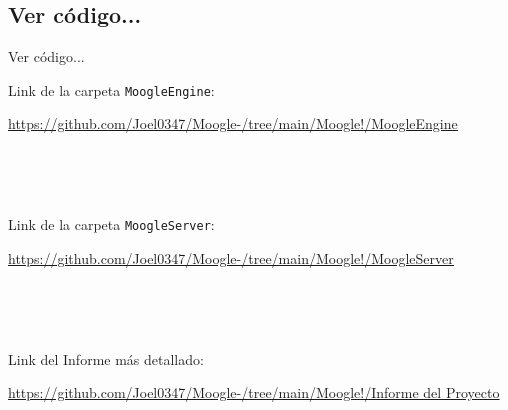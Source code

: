 \subsection{Ver código...}
\begin{frame}[fragile]{Ver código...}

{\small{Link de la carpeta \texttt{MoogleEngine}:}}


\textcolor{blue}{\underline{\tiny\url{https://github.com/Joel0347/Moogle-/tree/main/Moogle!/MoogleEngine}}}


\ 


\ 


{\small{Link de la carpeta \texttt{MoogleServer}:}}


\textcolor{blue}{\underline{\tiny\url{https://github.com/Joel0347/Moogle-/tree/main/Moogle!/MoogleServer}}}


\ 


\


{\small {Link del Informe más detallado:}}


\textcolor{blue}{\underline{\tiny\url{https://github.com/Joel0347/Moogle-/tree/main/Moogle!/Informe del Proyecto}}}

\end{frame}

